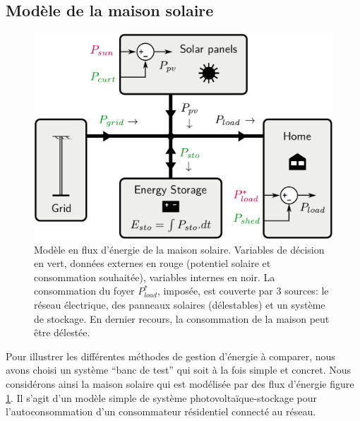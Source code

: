\documentclass[a4paper,10pt,twocolumn]{article}
\begin{document}
\subsection{Modèle de la maison solaire}

\begin{figure}[!ht]
        \begin{center}
                \includegraphics[width=0.9\columnwidth]{figures/solar_home.pdf}
        \end{center}

        \caption{Modèle en flux d'énergie de la maison solaire.
        Variables de décision en vert, données externes en rouge (potentiel solaire et consommation souhaitée), variables internes en noir.
        La consommation du foyer $P_{load}^*$, imposée, est couverte par 3 sources:
        le réseau électrique, des panneaux solaires (délestables)
        et un système de stockage.
        En dernier recours, la consommation de la maison peut être délestée.
        }
        \label{fig:solhome}
\end{figure}

Pour illustrer les différentes méthodes de gestion d'énergie à comparer,
nous avons choisi un système ``banc de test'' qui soit à la fois simple et concret.
Nous considérons ainsi la maison solaire qui est modélisée par
des flux d'énergie figure \ref{fig:solhome}.
Il s'agit d'un modèle simple de système photovoltaïque-stockage
pour l'autoconsommation d'un consommateur résidentiel connecté au réseau.
\end{document}
